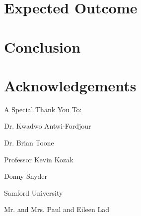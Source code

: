 \documentclass[10pt]{article}
\begin{document}



\section{Expected Outcome}

\section{Conclusion}

\section{Acknowledgements}
A Special Thank You To:

\vspace{2mm}\noindent\hspace{\parindent}Dr. Kwadwo Antwi-Fordjour

\vspace{2mm}\noindent\hspace{\parindent}Dr. Brian Toone

\vspace{2mm}\noindent\hspace{\parindent}Professor Kevin Kozak

\vspace{2mm}\noindent\hspace{\parindent}Donny Snyder

\vspace{2mm}\noindent\hspace{\parindent}Samford University

\vspace{2mm}\noindent\hspace{\parindent}Mr. and Mrs. Paul and Eileen Lad
\end{document}

